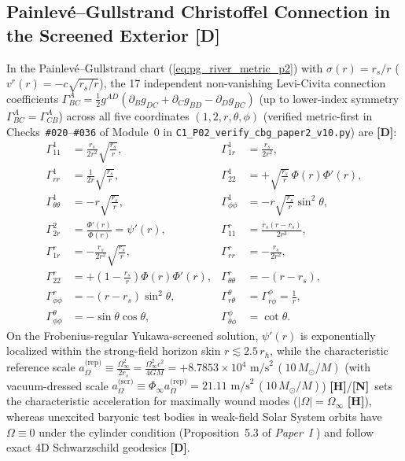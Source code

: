 \documentclass[11pt,a4paper]{article}
\newcommand{\catD}{\textbf{\textcolor{blue!75!black}{[D]}}}
\newcommand{\catH}{\textbf{\textcolor{orange!85!black}{[H]}}}
\newcommand{\catN}{\textbf{\textcolor{teal!75!black}{[N]}}}
\theoremstyle{plain}
\theoremstyle{definition}
\theoremstyle{remark}
\numberwithin{equation}{section}
\begin{document}
\subsection{\texorpdfstring{Painlev\'e--Gullstrand Christoffel Connection in the Screened Exterior \catD}{Painleve-Gullstrand Christoffel Connection in the Screened Exterior}}

In the Painlev\'e--Gullstrand chart (\ref{eq:pg_river_metric_p2}) with $\sigma(r) = r_s/r$ ($v^r(r) = -c\sqrt{r_s/r}$), the 17 independent non-vanishing Levi-Civita connection coefficients $\Gamma^A_{BC} = \frac{1}{2}g^{AD}(\partial_B g_{DC} + \partial_C g_{BD} - \partial_D g_{BC})$ (up to lower-index symmetry $\Gamma^A_{BC} = \Gamma^A_{CB}$) across all five coordinates $(1, 2, r, \theta, \phi)$ (verified metric-first in Checks~\texttt{\#020}--\texttt{\#036} of Module~0 in \allowbreak\texttt{C1\_P02\_verify\_cbg\_paper2\_v10.py}) are \catD:
\begin{align}
\Gamma^1_{11} &= \frac{r_s}{2r^2}\sqrt{\frac{r_s}{r}}, &
\Gamma^1_{1r} &= \frac{r_s}{2r^2}, \nonumber\\[3pt]
\Gamma^1_{rr} &= \frac{1}{2r}\sqrt{\frac{r_s}{r}}, &
\Gamma^1_{22} &= +\sqrt{\frac{r_s}{r}}\,\Phi(r)\Phi'(r), \nonumber\\[3pt]
\Gamma^1_{\theta\theta} &= -r\sqrt{\frac{r_s}{r}}, &
\Gamma^1_{\phi\phi} &= -r\sqrt{\frac{r_s}{r}}\sin^2\theta, \nonumber\\[3pt]
\Gamma^2_{2r} &= \frac{\Phi'(r)}{\Phi(r)} = \psi'(r), &
\Gamma^r_{11} &= \frac{r_s(r - r_s)}{2r^3}, \nonumber\\[3pt]
\Gamma^r_{1r} &= -\frac{r_s}{2r^2}\sqrt{\frac{r_s}{r}}, &
\Gamma^r_{rr} &= -\frac{r_s}{2r^2}, \nonumber\\[3pt]
\Gamma^r_{22} &= +\left(1 - \frac{r_s}{r}\right)\Phi(r)\Phi'(r), &
\Gamma^r_{\theta\theta} &= -(r - r_s), \nonumber\\[3pt]
\Gamma^r_{\phi\phi} &= -(r - r_s)\sin^2\theta, &
\Gamma^\theta_{r\theta} &= \Gamma^\phi_{r\phi} = \frac{1}{r}, \nonumber\\[3pt]
\Gamma^\theta_{\phi\phi} &= -\sin\theta\cos\theta, &
\Gamma^\phi_{\theta\phi} &= \cot\theta.
\label{eq:full_5d_christoffels}
\end{align}
On the Frobenius-regular Yukawa-screened solution, $\psi'(r)$ is exponentially localized within the strong-field horizon skin $r \lesssim 2.5\,r_h$, while the characteristic reference scale $a_{\Omega}^{\text{(rep)}} \equiv \frac{\Omega_{\infty}^2}{2r_s} = \frac{\Omega_{\infty}^2 c^2}{4GM} = +8.7853 \times 10^4\text{ m/s}^2\,(10\,M_{\odot}/M)$ (with vacuum-dressed scale $a_{\Omega}^{\text{(scr)}} \equiv \Phi_{\infty}a_{\Omega}^{\text{(rep)}} = 21.11\text{ m/s}^2\,(10\,M_{\odot}/M)$) \catH/\catN\ sets the characteristic acceleration for maximally wound modes ($|\Omega| = \Omega_{\infty}$ \catH), whereas unexcited baryonic test bodies in weak-field Solar System orbits have $\Omega \equiv 0$ under the cylinder condition (Proposition~5.3 of \textit{Paper~I} \cite{jimenez2026a}) and follow exact 4D Schwarzschild geodesics \catD.
\end{document}
